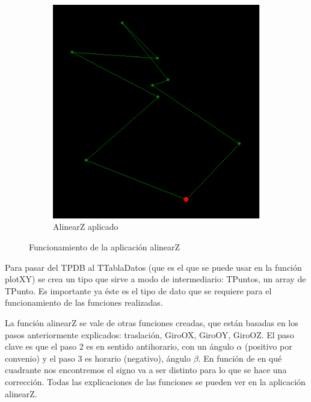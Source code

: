 \documentclass[a4paper,11pt]{report}
\begin{document}
\begin{figure}[h!]
\begin{subfigure}{0.45\textwidth}
 		\includegraphics[width=\linewidth]{Figuras/Figura34}
 		\caption{AlinearZ aplicado}
 	\end{subfigure}
 	
 	\caption{Funcionamiento de la aplicación alinearZ}
 	\label{aliZ}
 \end{figure}
 
 Para pasar del TPDB al TTablaDatos (que es el que se puede usar en la función plotXY) se crea un tipo que sirve a modo de intermediario: TPuntos, un array de TPunto. Es importante ya éste es el tipo de dato que se requiere para el funcionamiento de las funciones realizadas.
 
 La función alinearZ se vale de otras funciones creadas, que están basadas en los pasos anteriormente explicados: traslación, GiroOX, GiroOY, GiroOZ. El paso clave es que el paso 2 es en sentido antihorario, con un ángulo $\alpha$  (positivo por convenio) y el paso 3 es horario (negativo), ángulo $\beta$. En función de en qué cuadrante nos encontremos el signo va a ser distinto para lo que se hace una corrección. Todas las explicaciones de las funciones se pueden ver en la aplicación alinearZ.
 
\end{document}
